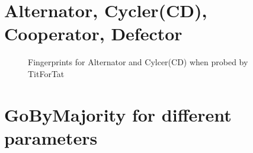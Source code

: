\section{Alternator, Cycler(CD), Cooperator, Defector}

\begin{figure}[htbp!]
    \centering
    \caption{Fingerprints for Alternator and Cylcer(CD) when probed by TitForTat}
    \label{fig:alt_cycler}
\end{figure}

\section{GoByMajority for different parameters}\label{sec:GBM}

